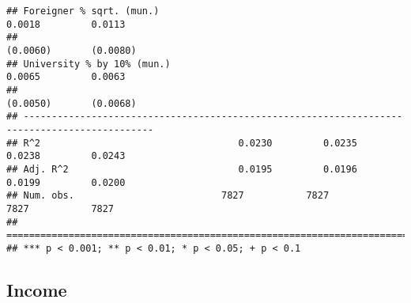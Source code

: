 \documentclass[
]{article}
\begin{document}
\begin{verbatim}
## Foreigner % sqrt. (mun.)                                            0.0018         0.0113    
##                                                                    (0.0060)       (0.0080)   
## University % by 10% (mun.)                                          0.0065         0.0063    
##                                                                    (0.0050)       (0.0068)   
## ---------------------------------------------------------------------------------------------
## R^2                                   0.0230         0.0235         0.0238         0.0243    
## Adj. R^2                              0.0195         0.0196         0.0199         0.0200    
## Num. obs.                          7827           7827           7827           7827         
## =============================================================================================
## *** p < 0.001; ** p < 0.01; * p < 0.05; + p < 0.1
\end{verbatim}

\hypertarget{income}{%
\subsection{Income}\label{income}}
\end{document}
